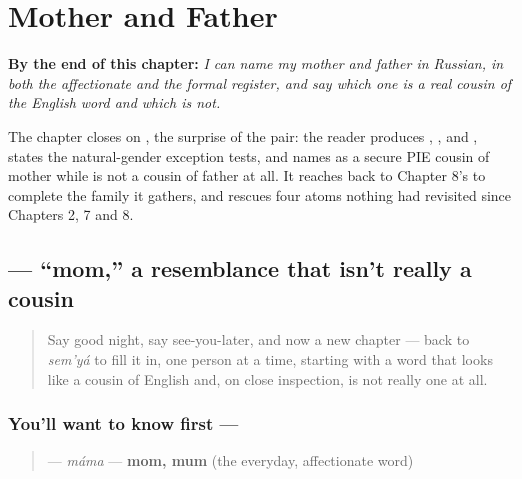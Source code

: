 
\chapter{Mother and Father}
\label{ch:russian-mother-and-father}

\begin{chapteropening}
\textbf{By the end of this chapter:} \emph{I can name my mother and father in Russian, in both the affectionate and the formal register, and say which one is a real cousin of the English word and which is not.}

The chapter closes on , the surprise of the pair: the reader produces , ,  and , states the natural-gender exception  tests, and names  as a secure PIE cousin of mother while  is not a cousin of father at all. It reaches back to Chapter 8's  to complete the family it gathers, and rescues four atoms nothing had revisited since Chapters 2, 7 and 8.
\end{chapteropening}

\section[\texorpdfstring{\ru{мама} (máma)}{мама (máma)}]{ — \textquotedblleft{}mom,\textquotedblright{} a resemblance that isn't really a cousin}

\label{lesson:RU-C12-mama}



\begin{quote}
Say good night, say see-you-later, and now a new chapter — back to \emph{sem'yá} to fill it in, one person at a time, starting with a word that looks like a cousin of English and, on close inspection, is not really one at all.
\end{quote}

\subsection*{You'll want to know first — }
\begin{quote}
\textbf{} — \emph{máma} — \textbf{mom, mum} (the everyday, affectionate word)
\end{quote}

